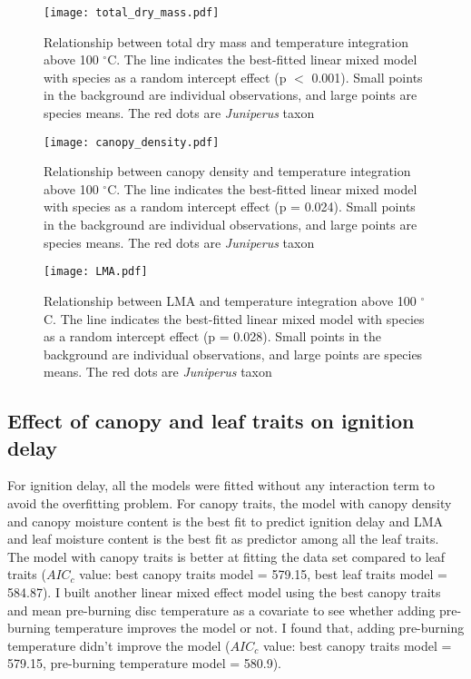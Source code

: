 \documentclass[12pt]{report}
\begin{document}
\begin{figure}
    \centering
    \texttt{[image: total\_dry\_mass.pdf]}
    \caption{Relationship between total dry mass and temperature integration above 100 $^{\circ}$C. The line indicates the best-fitted linear mixed model with species as a random intercept effect (p $<$ 0.001). Small points in the background are individual observations, and large points are species means. The red dots are \emph{Juniperus} taxon}
\end{figure}


\begin{figure}
    \centering
    \texttt{[image: canopy\_density.pdf]}
    \caption{Relationship between canopy density and temperature integration above 100 $^{\circ}$C. The line indicates the best-fitted linear mixed model with species as a random intercept effect (p = 0.024). Small points in the background are individual observations, and large points are species means. The red dots are \emph{Juniperus} taxon}
\end{figure}


\begin{figure}
    \centering
    \texttt{[image: LMA.pdf]}
    \caption{Relationship between LMA and temperature integration above 100 $^{\circ}$C. The line indicates the best-fitted linear mixed model with species as a random intercept effect (p = 0.028). Small points in the background are individual observations, and large points are species means. The red dots are \emph{Juniperus} taxon}
\end{figure}






\subsection{Effect of canopy and leaf traits on ignition delay}

For ignition delay, all the models were fitted without any interaction term to avoid the overfitting problem. For canopy traits, the model with canopy density and canopy moisture content is the best fit to predict ignition delay and LMA and leaf moisture content is the best fit as predictor among all the leaf traits. The model with canopy traits is better at fitting the data set compared to leaf traits ($AIC_{c}$ value: best canopy traits model = 579.15, best leaf traits model = 584.87). I built another linear mixed effect model using the best canopy traits and  mean pre-burning disc temperature as a covariate to see whether adding pre-burning temperature improves the model or not. I found that, adding pre-burning temperature didn't improve the model ($AIC_{c}$ value: best canopy traits model = 579.15, pre-burning temperature model = 580.9).
\end{document}
